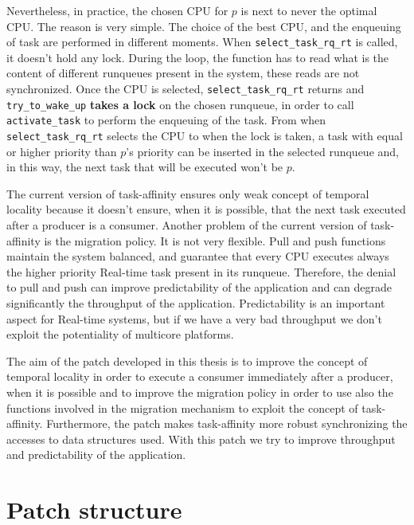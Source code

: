 Nevertheless, in practice, the chosen CPU for $p$ is next to never the optimal
CPU. The reason is very simple. The choice of the best 
CPU, and the enqueuing of task are performed in different moments. When \texttt{select\_task\_rq\_rt} is called, it doesn't hold any lock. During the loop, 
the function has to read what is the content of different runqueues present in
the system, these reads are not synchronized. Once the CPU is selected, 
\texttt{select\_task\_rq\_rt} returns and \texttt{try\_to\_wake\_up} \textbf{takes a lock} on the chosen runqueue, in order to call 
\texttt{activate\_task} to perform the enqueuing of the task. From when
\texttt{select\_task\_rq\_rt} selects the CPU to when the lock is taken, a task 
with equal or higher priority than $p$'s priority can be inserted in the selected runqueue and, in this way, the next task that will be executed won't be 
$p$. 

The current version of task-affinity ensures only weak concept of temporal locality because it doesn't ensure, when it is possible, that the next task 
executed after a producer is a consumer. Another problem of the current version of task-affinity is the migration policy. It is not very flexible. Pull 
and push functions maintain the system balanced, and guarantee that every CPU executes always the higher priority Real-time task present in its runqueue.
Therefore, the denial to pull and push can improve predictability of the application and can degrade significantly the throughput of the application.
Predictability is an important aspect for Real-time systems, but if we have a very bad throughput we don't exploit the potentiality of multicore platforms.

The aim of the patch developed in this thesis is to improve the concept of temporal locality in order to execute a consumer immediately after a 
producer, when it is possible and to improve the migration policy in order to use also the functions involved in the migration mechanism to exploit the 
concept of task-affinity. Furthermore, the patch makes task-affinity more robust synchronizing the accesses to data structures used. With this patch we 
try to improve throughput and predictability of the application. 

\section{Patch structure}

